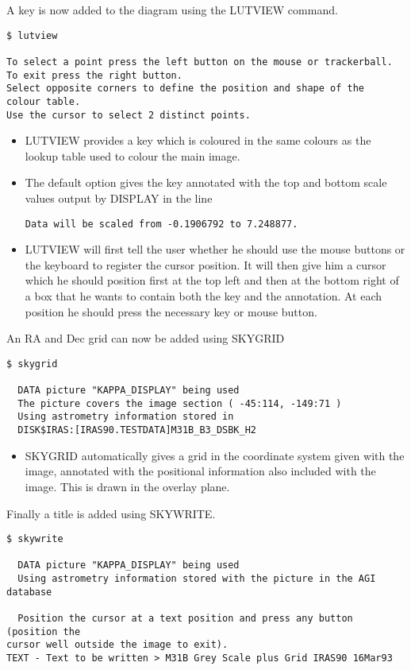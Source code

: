 A key is now added to the diagram using the LUTVIEW command.
\begin{small}
\begin{verbatim}
$ lutview 

To select a point press the left button on the mouse or trackerball.
To exit press the right button.
Select opposite corners to define the position and shape of the
colour table.
Use the cursor to select 2 distinct points.
\end{verbatim}
\end{small}
\begin{itemize}
\item LUTVIEW provides a key which is coloured in the same colours as the
lookup table used to colour the main image.
\item The default option gives the key annotated with the top and bottom scale
values output by DISPLAY in the line
\begin{small}
\begin{verbatim}
Data will be scaled from -0.1906792 to 7.248877.
\end{verbatim}
\end{small}
\item LUTVIEW will first tell the user whether he should use the mouse buttons
or the keyboard to register the cursor position. It will then give him a cursor
which he should position first at the  top left and then at the bottom right
of a box that he wants to contain both the key and the annotation. At each 
position he should press the necessary key or mouse button.
\end{itemize}
An RA and Dec grid can now be added using SKYGRID
\begin{small}
\begin{verbatim}
$ skygrid

  DATA picture "KAPPA_DISPLAY" being used
  The picture covers the image section ( -45:114, -149:71 )
  Using astrometry information stored in
  DISK$IRAS:[IRAS90.TESTDATA]M31B_B3_DSBK_H2

\end{verbatim}
\end{small}
\begin{itemize}
\item SKYGRID automatically gives a grid in the coordinate system given with 
the image, annotated with the positional information also included with the 
image. This is drawn in the overlay  plane.
\end{itemize}
Finally a title is added using SKYWRITE.
\begin{small}
\begin{verbatim}
$ skywrite

  DATA picture "KAPPA_DISPLAY" being used
  Using astrometry information stored with the picture in the AGI database

  Position the cursor at a text position and press any button (position the
cursor well outside the image to exit).
TEXT - Text to be written > M31B Grey Scale plus Grid IRAS90 16Mar93
\end{verbatim}
\end{small}
